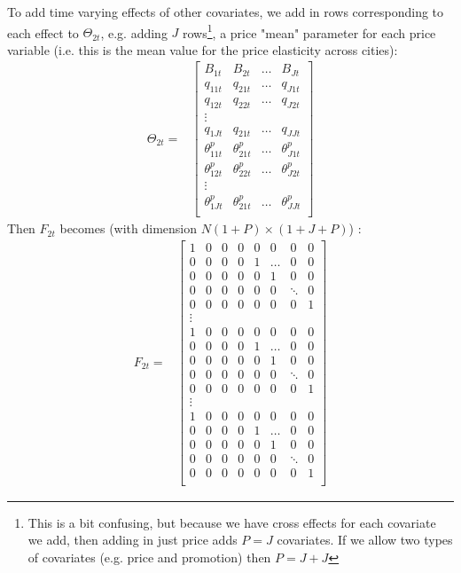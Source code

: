 \documentclass[letter,10pt]{article}
\begin{document}
To add time varying effects of other covariates, we add in rows corresponding to each effect to $\Theta_{2t}$, e.g. 
adding $J$ rows\footnote{\baselineskip 12pt This is a bit confusing, but because we have cross effects for each covariate we add, then 
adding in just price adds $P=J$ covariates. If we allow two types of covariates (e.g. price and promotion) then
$P=J+J$}, 
a price "mean" parameter for each price variable (i.e. this is the mean value for the price elasticity across cities): 
\begin{equation}
\begin{array}{ll}
      \Theta_{2t} = & \left[\begin{array}{cccl}
		 B_{1t} & B_{2t} &\ldots & B_{Jt} \\
		q_{11t} & q_{21t} & \ldots & q_{J1t} \\
		q_{12t} & q_{22t} & \ldots & q_{J2t} \\
	\vdots\\
		q_{1Jt} & q_{21t} & \ldots & q_{JJt} \\

		\theta^p_{11t} & \theta^p_{21t} & \ldots & \theta^p_{J1t} \\
		\theta^p_{12t} & \theta^p_{22t} & \ldots & \theta^p_{J2t} \\
	\vdots\\
		\theta^p_{1Jt} & \theta^p_{21t} & \ldots & \theta^p_{JJt} \\

		\end{array}\right]
\end{array}
\end{equation} 
Then $F_{2t}$ becomes (with dimension $N(1+P)\times (1+J+P)$) :
\begin{equation}
\begin{array}{ll}
      F_{2t} = & \left[\begin{array}{cccccccc}
		1 & 0 & 0 & 0 & 0 & 0 & 0 & 0 \\
		0 &0 &0 &0 &1 &\ldots &0 &0\\
		0 & 0 & 0 & 0 & 0 &1 & 0 &0\\
		0 & 0 & 0 & 0 & 0 & 0 &\ddots &0\\
		0 & 0 & 0 & 0 & 0 &0 &0 & 1\\
\vdots\\
		1 & 0 & 0 & 0 & 0 & 0 & 0 & 0 \\
		0 &0 &0 &0 &1 &\ldots &0 &0\\
		0 & 0 & 0 & 0 & 0 &1 & 0 &0\\
		0 & 0 & 0 & 0 & 0 & 0 &\ddots &0\\
		0 & 0 & 0 & 0 & 0 &0 &0 & 1\\
\vdots\\
		1 & 0 & 0 & 0 & 0 & 0 & 0 & 0 \\
		0 &0 &0 &0 &1 &\ldots &0 &0\\
		0 & 0 & 0 & 0 & 0 &1 & 0 &0\\
		0 & 0 & 0 & 0 & 0 & 0 &\ddots &0\\
		0 & 0 & 0 & 0 & 0 &0 &0 & 1\\
		\end{array}\right]
\end{array}
\end{equation} 
\end{document}

